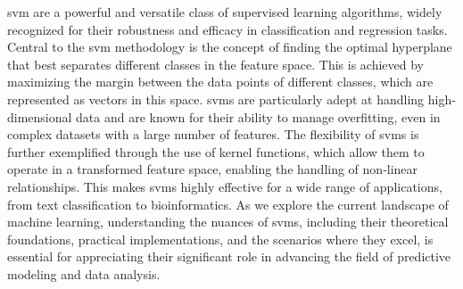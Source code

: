 \documentclass[../../../main.tex]{subfiles}
\begin{document}
\acrfull{svm} are a powerful and versatile class of supervised learning algorithms, widely recognized for their robustness and efficacy in classification and regression tasks. Central to the \acrfull{svm} methodology is the concept of finding the optimal hyperplane that best separates different classes in the feature space. This is achieved by maximizing the margin between the data points of different classes, which are represented as vectors in this space. \acrshort{svm}s are particularly adept at handling high-dimensional data and are known for their ability to manage overfitting, even in complex datasets with a large number of features. The flexibility of \acrshort{svm}s is further exemplified through the use of kernel functions, which allow them to operate in a transformed feature space, enabling the handling of non-linear relationships. This makes \acrshort{svm}s highly effective for a wide range of applications, from text classification to bioinformatics. As we explore the current landscape of machine learning, understanding the nuances of \acrshort{svm}s, including their theoretical foundations, practical implementations, and the scenarios where they excel, is essential for appreciating their significant role in advancing the field of predictive modeling and data analysis.
\end{document}
